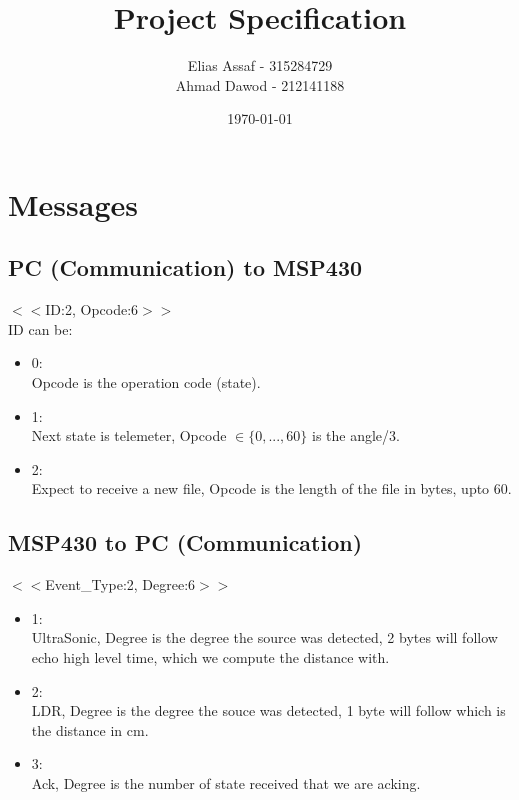 \documentclass{article}
\title{Project Specification}
\author{Elias Assaf - 315284729\\
        Ahmad Dawod - 212141188}
\date{\today}
\newcommand{\myfig}[4]{
\begin{figure}[h]
    \centering
    \captionsetup{justification=centering}
    \texttt{[image: figs\_spec/\#2]}
    \caption{#3}
    \label{fig:#4}
\end{figure}
}
\begin{document}
\maketitle
\section{Messages}
\subsection{PC (Communication) to MSP430}
$<<$ID:2, Opcode:6$>>$\\
ID can be:
\begin{itemize}
    \item 0:\\
    Opcode is the operation code (state).
    \item 1:\\
    Next state is telemeter, Opcode $\in \{0,...,60\}$ is the angle/3.
    \item 2:\\
    Expect to receive a new file, Opcode is the length of the file in bytes, upto 60.
\end{itemize}

\subsection{MSP430 to PC (Communication)}
$<<$Event\_Type:2, Degree:6$>>$\\
\begin{itemize}
    \item 1:\\
    UltraSonic, Degree is the degree the source was detected, 2 bytes will follow echo high level time, which we compute the distance with.
    \item 2:\\
    LDR, Degree is the degree the souce was detected, 1 byte will follow which is the distance in cm.
    \item 3:\\
    Ack, Degree is the number of state received that we are acking.
\end{itemize}
\end{document}
